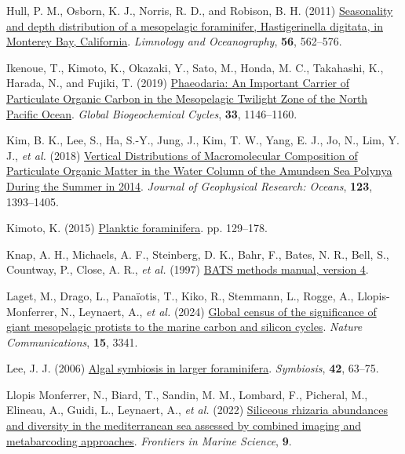 \documentclass[
]{article}
\newlength{\cslhangindent}
\newlength{\cslentryspacingunit} %
\newenvironment{CSLReferences}[2] %
 {%
  \setlength{\parindent}{0pt}
  \ifodd #1
  \let\oldpar\par
  \def\par{\hangindent=\cslhangindent\oldpar}
  \fi
  \setlength{\parskip}{#2\cslentryspacingunit}
 }%
 {}
\begin{document}
\begin{CSLReferences}{1}{0}
\leavevmode{}%
Hull, P. M., Osborn, K. J., Norris, R. D., and Robison, B. H. (2011)
\href{https://doi.org/10.4319/lo.2011.56.2.0562}{Seasonality and depth
distribution of a mesopelagic foraminifer, Hastigerinella digitata, in
Monterey Bay, California}. \emph{Limnology and Oceanography},
\textbf{56}, 562--576.

\leavevmode{}%
Ikenoue, T., Kimoto, K., Okazaki, Y., Sato, M., Honda, M. C., Takahashi,
K., Harada, N., and Fujiki, T. (2019)
\href{https://doi.org/10.1029/2019GB006258}{Phaeodaria: An Important
Carrier of Particulate Organic Carbon in the Mesopelagic Twilight Zone
of the North Pacific Ocean}. \emph{Global Biogeochemical Cycles},
\textbf{33}, 1146--1160.

\leavevmode{}%
Kim, B. K., Lee, S., Ha, S.-Y., Jung, J., Kim, T. W., Yang, E. J., Jo,
N., Lim, Y. J., \emph{et al.} (2018)
\href{https://doi.org/10.1002/2017JC013457}{Vertical Distributions of
Macromolecular Composition of Particulate Organic Matter in the Water
Column of the Amundsen Sea Polynya During the Summer in 2014}.
\emph{Journal of Geophysical Research: Oceans}, \textbf{123},
1393--1405.

\leavevmode{}%
Kimoto, K. (2015)
\href{https://doi.org/10.1007/978-4-431-55130-0_7}{Planktic
foraminifera}. pp. 129--178.

\leavevmode{}%
Knap, A. H., Michaels, A. F., Steinberg, D. K., Bahr, F., Bates, N. R.,
Bell, S., Countway, P., Close, A. R., \emph{et al.} (1997)
\href{https://eprints.soton.ac.uk/361194/}{BATS methods manual, version
4}.

\leavevmode{}%
Laget, M., Drago, L., Panaïotis, T., Kiko, R., Stemmann, L., Rogge, A.,
Llopis-Monferrer, N., Leynaert, A., \emph{et al.} (2024)
\href{https://doi.org/10.1038/s41467-024-47651-4}{Global census of the
significance of giant mesopelagic protists to the marine carbon and
silicon cycles}. \emph{Nature Communications}, \textbf{15}, 3341.

\leavevmode{}%
Lee, J. J. (2006)
\href{https://dalspace.library.dal.ca/bitstream/handle/10222/78255/VOLUME\%2042-NUMBER\%202-2006-PAGE\%2063.pdf?sequence=1}{Algal
symbiosis in larger foraminifera}. \emph{Symbiosis}, \textbf{42},
63--75.

\leavevmode{}%
Llopis Monferrer, N., Biard, T., Sandin, M. M., Lombard, F., Picheral,
M., Elineau, A., Guidi, L., Leynaert, A., \emph{et al.} (2022)
\href{https://www.frontiersin.org/articles/10.3389/fmars.2022.895995}{Siliceous
rhizaria abundances and diversity in the mediterranean sea assessed by
combined imaging and metabarcoding approaches}. \emph{Frontiers in
Marine Science}, \textbf{9}.


\end{CSLReferences}
\end{document}
